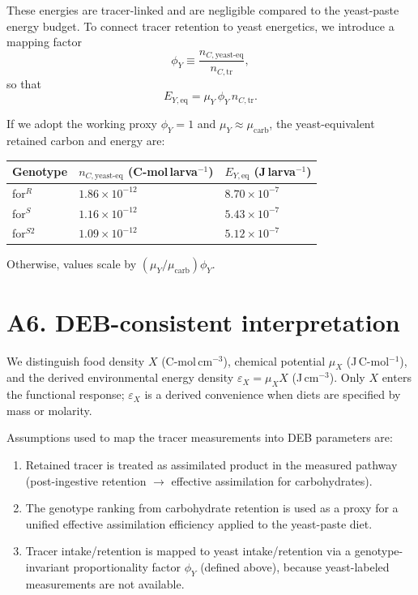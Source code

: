 \documentclass[11pt]{article}
\begin{document}
These energies are tracer-linked and are negligible compared to the yeast-paste energy budget. To connect tracer retention to yeast energetics, we introduce a mapping factor
\begin{equation}
  \phi_Y \equiv \frac{n_{C,\mathrm{yeast\text{-}eq}}}{n_{C,\mathrm{tr}}},
\end{equation}
so that
\begin{equation}
  E_{Y,\mathrm{eq}} = \mu_Y\,\phi_Y\,n_{C,\mathrm{tr}}.
\end{equation}

If we adopt the working proxy $\phi_Y=1$ and $\mu_Y\approx\mu_{\mathrm{carb}}$, the yeast-equivalent retained carbon and energy are:
\begin{center}
\begin{tabular}{lll}
\toprule
Genotype & $n_{C,\mathrm{yeast\text{-}eq}}$ (C-mol\,larva$^{-1}$) & $E_{Y,\mathrm{eq}}$ (J\,larva$^{-1}$) \\
\midrule
for$^R$    & $1.86\times10^{-12}$ & $8.70\times10^{-7}$ \\
for$^S$    & $1.16\times10^{-12}$ & $5.43\times10^{-7}$ \\
for$^{S2}$ & $1.09\times10^{-12}$ & $5.12\times10^{-7}$ \\
\bottomrule
\end{tabular}
\end{center}

Otherwise, values scale by $(\mu_Y/\mu_{\mathrm{carb}})\phi_Y$.

\section*{A6. DEB-consistent interpretation}
We distinguish food density $X$ (C-mol\,cm$^{-3}$), chemical potential $\mu_X$ (J\,C-mol$^{-1}$), and the derived environmental energy density $\varepsilon_X=\mu_X X$ (J\,cm$^{-3}$). Only $X$ enters the functional response; $\varepsilon_X$ is a derived convenience when diets are specified by mass or molarity.

Assumptions used to map the tracer measurements into DEB parameters are:

\begin{enumerate}
  \item Retained tracer is treated as assimilated product in the measured pathway (post-ingestive retention $\rightarrow$ effective assimilation for carbohydrates).
  \item The genotype ranking from carbohydrate retention is used as a proxy for a unified effective assimilation efficiency applied to the yeast-paste diet.
  \item Tracer intake/retention is mapped to yeast intake/retention via a genotype-invariant proportionality factor $\phi_Y$ (defined above), because yeast-labeled measurements are not available.
\end{enumerate}
\end{document}
